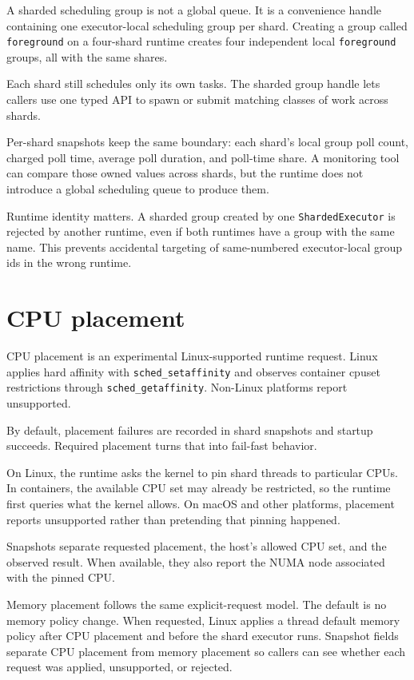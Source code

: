 A sharded scheduling group is not a global queue. It is a convenience handle
containing one executor-local scheduling group per shard. Creating a group
called \texttt{foreground} on a four-shard runtime creates four independent
local \texttt{foreground} groups, all with the same shares.

Each shard still schedules only its own tasks. The sharded group handle lets
callers use one typed API to spawn or submit matching classes of work across
shards.

Per-shard snapshots keep the same boundary: each shard's local group poll
count, charged poll time, average poll duration, and poll-time share. A
monitoring tool can compare those owned values across shards, but the runtime
does not introduce a global scheduling queue to produce them.

Runtime identity matters. A sharded group created by one
\texttt{ShardedExecutor} is rejected by another runtime, even if both runtimes
have a group with the same name. This prevents accidental targeting of
same-numbered executor-local group ids in the wrong runtime.

\section{CPU placement}

CPU placement is an experimental Linux-supported runtime request. Linux applies
hard affinity with \texttt{sched\_setaffinity} and observes container cpuset
restrictions through \texttt{sched\_getaffinity}. Non-Linux platforms report
unsupported.

By default, placement failures are recorded in shard snapshots and startup
succeeds. Required placement turns that into fail-fast behavior.

On Linux, the runtime asks the kernel to pin shard threads to particular CPUs.
In containers, the available CPU set may already be restricted, so the runtime
first queries what the kernel allows. On macOS and other platforms, placement
reports unsupported rather than pretending that pinning happened.

Snapshots separate requested placement, the host's allowed CPU set, and the
observed result. When available, they also report the NUMA node associated with
the pinned CPU.

Memory placement follows the same explicit-request model. The default is no
memory policy change. When requested, Linux applies a thread default memory
policy after CPU placement and before the shard executor runs. Snapshot fields
separate CPU placement from memory placement so callers can see whether each
request was applied, unsupported, or rejected.
